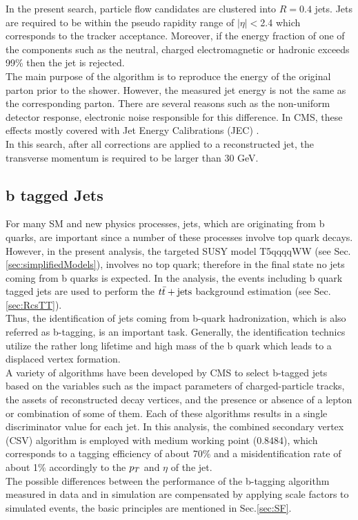In the present search, particle flow candidates are clustered into $R = 0.4$ jets. Jets are required to be within the pseudo rapidity range of $|\eta|<$2.4 which corresponds to the tracker acceptance. Moreover, if the energy fraction of one of the components such as the neutral, charged electromagnetic or hadronic exceeds 99\% then the jet is rejected.\\
The main purpose of the algorithm is to reproduce the energy of the original parton prior to the shower. However, the measured jet energy is not the same as the corresponding parton. There are several reasons such as the non-uniform detector response, electronic noise responsible for this difference. In CMS, these effects mostly covered with Jet Energy Calibrations (JEC) \cite{JEC}.\\
In this search, after all corrections are applied to a reconstructed jet, the transverse momentum is required to be larger than 30 GeV.
\subsection{b tagged Jets}
\label{sec:btagging}
For many SM and new physics processes, jets, which are originating from b quarks, are important since a number of these processes involve top quark decays. However, in the present analysis, the targeted SUSY model T5qqqqWW (see Sec.\ref{sec:simplifiedModels}), involves no top quark; therefore in the final state no jets coming from b quarks is expected. In the analysis, the events including b quark tagged jets are used to perform the $t\bar{t}+\textrm{jets}$ background estimation (see Sec.\ref{sec:RcsTT}).
\\
Thus, the identification of jets coming from b-quark hadronization, which is also referred as b-tagging, is an important task.
Generally, the identification technics \cite{btagging} utilize the rather long lifetime and high mass of the b quark which leads to a displaced vertex formation.\\
A variety of algorithms have been developed by CMS \cite{btagging2} to select b-tagged jets based on the variables such as the impact parameters of charged-particle tracks, the assets of reconstructed decay vertices, and the presence or absence of a lepton or combination of some of them. Each of these algorithms results in a single discriminator value for each jet. 
In this analysis, the combined secondary vertex (CSV) algorithm is employed with medium working point (0.8484), which corresponds to a tagging efficiency of about 70\% and a misidentification rate of about 1\% accordingly to the $p_T$ and $\eta$ of the jet.\\
The possible differences between the performance of the b-tagging algorithm measured in data and in simulation are compensated by applying scale factors to simulated events, the basic principles are mentioned in Sec.\ref{sec:SF}.
